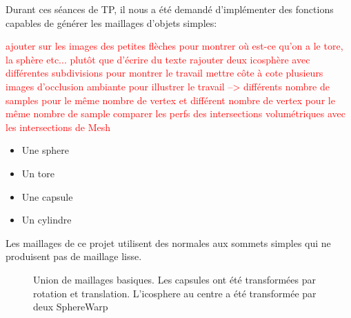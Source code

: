 Durant ces séances de TP, il nous a été demandé d'implémenter des fonctions capables de générer les maillages d'objets simples:

\textcolor{red}{ajouter sur les images des petites flèches pour montrer où est-ce qu'on a le tore, la sphère etc... plutôt que d'écrire du texte}
\textcolor{red}{rajouter deux icosphère avec différentes subdivisions pour montrer le travail}
\textcolor{red}{mettre côte à cote plusieurs images d'occlusion ambiante pour illustrer le travail --> différents nombre de samples pour le même nombre de vertex et différent nombre de vertex pour le même nombre de sample}
\textcolor{red}{comparer les perfs des intersections volumétriques avec les intersections de Mesh}


\begin {itemize}
	\item {Une sphere}
	\item {Un tore}
	\item {Une capsule}
	\item {Un cylindre}
\end {itemize}

Les maillages de ce projet utilisent des normales aux sommets simples qui ne produisent pas de maillage lisse.

\begin{figure}[h!]

	\caption{Union de maillages basiques. Les capsules ont été transformées par rotation et translation. L'icosphere au centre a été transformée par deux SphereWarp}
\end{figure}
\FloatBarrier
